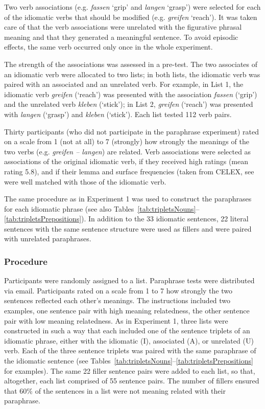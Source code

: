 \documentclass[output=paper]{langsci/langscibook}
\begin{document}
Two verb associations (e.g. \textit{fassen} ‘grip’ and \textit{langen} ‘grasp’) were selected for each of the idiomatic verbs that should be modified (e.g. \textit{greifen} ‘reach’). It was taken care of that the verb associations were unrelated with the figurative phrasal meaning and that they generated a meaningful sentence. To avoid episodic effects, the same verb occurred only once in the whole experiment. 

The strength of the associations was assessed in a pre-test. The two associates of an idiomatic verb were allocated to two lists; in both lists, the idiomatic verb was paired with an associated and an unrelated verb.  For example, in List 1, the idiomatic verb \textit{greifen} (‘reach’) was presented with the association \textit{fassen} (‘grip’) and the unrelated verb \textit{kleben} (‘stick’); in List 2, \textit{greifen} (‘reach’) was presented with \textit{langen} (‘grasp’) and \textit{kleben} (‘stick’). Each list tested 112 verb pairs. 

Thirty participants (who did not participate in the paraphrase experiment) rated on a scale from 1 (not at all) to 7 (strongly) how strongly the meanings of the two verbs (e.g. \textit{greifen – langen}) are related. Verb associations were selected as associations of the original idiomatic verb, if they received high ratings (mean rating 5.8), and if their lemma and surface frequencies (taken from CELEX, see \citep{baayen:1993} were well matched with those of the idiomatic verb. 

 The same procedure as in Experiment 1 was used to construct the paraphrases for each idiomatic phrase (see also Tables~\ref{tab:tripletsNouns}--\ref{tab:tripletsPrepositions}). In addition to the 33 idiomatic sentences, 22 literal sentences with the same sentence structure were used as fillers and were paired with unrelated paraphrases. 

\subsubsection{Procedure}

Participants were randomly assigned to a list. Paraphrase tests were distributed via email. Participants rated on a scale from 1 to 7 how strongly the two sentences reflected each other’s meanings. The instructions included two examples, one sentence pair with high meaning relatedness, the other sentence pair with low meaning relatedness. 
As in Experiment 1, three lists were constructed in such a way that each included one of the sentence triplets of an idiomatic phrase, either with the idiomatic (I), associated (A), or unrelated (U) verb. Each of the three sentence triplets was paired with the same paraphrase of the idiomatic sentence (see Tables~\ref{tab:tripletsNouns}--\ref{tab:tripletsPrepositions} for examples). The same 22 filler sentence pairs were added to each list, so that, altogether, each list comprised of 55 sentence pairs. The number of fillers ensured that 60\% of the sentences in a list were not meaning related with their paraphrase. 
\end{document}

